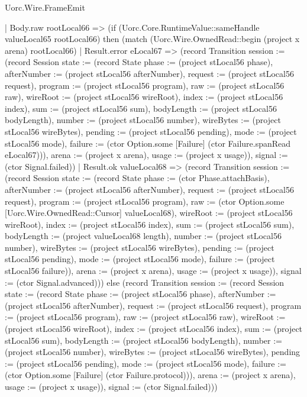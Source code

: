 \begin{lexlean}{Uorc.Wire.FrameEmit}
\begin{semanticmodule}
{            | Body.raw rootLocal66 => (if (Uorc.Core.RuntimeValue::sameHandle valueLocal65 rootLocal66) then (match (Uorc.Wire.OwnedRead::begin (project x arena) rootLocal66)
              | Result.error eLocal67 => (record Transition {session := (record Session {state := (record State {phase := (project stLocal56 phase), afterNumber := (project stLocal56 afterNumber), request := (project stLocal56 request), program := (project stLocal56 program), raw := (project stLocal56 raw), wireRoot := (project stLocal56 wireRoot), index := (project stLocal56 index), sum := (project stLocal56 sum), bodyLength := (project stLocal56 bodyLength), number := (project stLocal56 number), wireBytes := (project stLocal56 wireBytes), pending := (project stLocal56 pending), mode := (project stLocal56 mode), failure := (ctor Option.some [Failure] (ctor Failure.spanRead eLocal67))}), arena := (project x arena), usage := (project x usage)}), signal := (ctor Signal.failed)})
              | Result.ok valueLocal68 => (record Transition {session := (record Session {state := (record State {phase := (ctor Phase.attachBasis), afterNumber := (project stLocal56 afterNumber), request := (project stLocal56 request), program := (project stLocal56 program), raw := (ctor Option.some [Uorc.Wire.OwnedRead::Cursor] valueLocal68), wireRoot := (project stLocal56 wireRoot), index := (project stLocal56 index), sum := (project stLocal56 sum), bodyLength := (project valueLocal68 length), number := (project stLocal56 number), wireBytes := (project stLocal56 wireBytes), pending := (project stLocal56 pending), mode := (project stLocal56 mode), failure := (project stLocal56 failure)}), arena := (project x arena), usage := (project x usage)}), signal := (ctor Signal.advanced)})) else (record Transition {session := (record Session {state := (record State {phase := (project stLocal56 phase), afterNumber := (project stLocal56 afterNumber), request := (project stLocal56 request), program := (project stLocal56 program), raw := (project stLocal56 raw), wireRoot := (project stLocal56 wireRoot), index := (project stLocal56 index), sum := (project stLocal56 sum), bodyLength := (project stLocal56 bodyLength), number := (project stLocal56 number), wireBytes := (project stLocal56 wireBytes), pending := (project stLocal56 pending), mode := (project stLocal56 mode), failure := (ctor Option.some [Failure] (ctor Failure.protocol))}), arena := (project x arena), usage := (project x usage)}), signal := (ctor Signal.failed)}))
}
\end{semanticmodule}
\end{lexlean}
